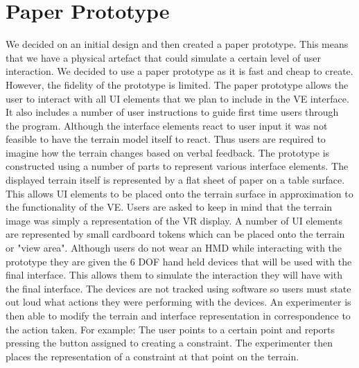 \documentclass{article}
\begin{document}
\section{Paper Prototype}
We decided on an initial design and then created a paper prototype. This means that we have a physical artefact that could simulate a certain level of user interaction. We decided to use a paper prototype as it is fast and cheap to create. However, the fidelity of the prototype is limited.
\newline\newline
The paper prototype allows the user to interact with all UI elements that we plan to include in the VE interface. It also includes a number of user instructions to guide first time users through the program. Although the interface elements react to user input it was not feasible to have the terrain model itself to react. Thus users are required to imagine how the terrain changes based on verbal feedback.
\newline\newline
The prototype is constructed using a number of parts to represent various interface elements. The displayed terrain itself is represented by a flat sheet of paper on a table surface. This allows UI elements to be placed onto the terrain surface in approximation to the functionality of the VE. Users are asked to keep in mind that the terrain image was simply a representation of the VR display. A number of UI elements are represented by small cardboard tokens which can be placed onto the terrain or "view area".
\newline\newline
Although users do not wear an HMD while interacting with the prototype they are given the 6 DOF hand held devices that will be used with the final interface. This allows them to simulate the interaction they will have with the final interface. The devices are not tracked using software so users must state out loud what actions they were performing with the devices. An experimenter is then able to modify the terrain and interface representation in correspondence to the action taken. For example: The user points to a certain point and reports pressing the button assigned to creating a constraint. The experimenter then places the representation of a constraint at that point on the terrain.
\end{document}
